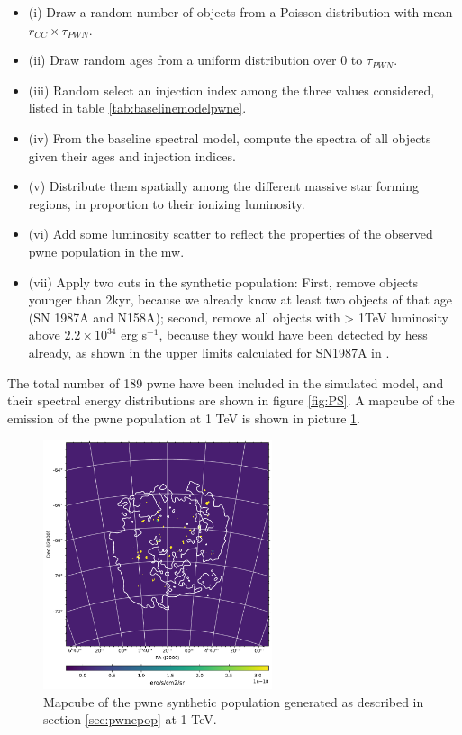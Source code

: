 \documentclass[main.tex]{subfiles}
\begin{document}
\begin{itemize}
\item (i) Draw a random number of objects from a Poisson distribution with mean $r_{CC} \times \tau_{PWN}$.
\item (ii) Draw random ages from a uniform distribution over 0 to $\tau_{PWN}$.
\item(iii) Random select an injection index among the three values considered, listed in table \ref{tab:baselinemodelpwne}.
\item (iv) From the baseline spectral model, compute the spectra of all objects given their ages and injection indices.
\item (v) Distribute them spatially among the different massive star forming regions, in proportion to their ionizing luminosity.
\item(vi) Add some luminosity scatter to reflect the properties of the observed \gls{pwne} population in the \gls{mw}.
  \item(vii) Apply two cuts in the synthetic population: First, remove objects younger than 2kyr, because we already know at least two objects of that age (SN 1987A and N158A); second, remove all objects with > 1TeV luminosity above $2.2 \times 10^{34}$ erg s$^{-1}$, because they would have been detected by \gls{hess} already, as shown in the upper limits calculated for SN1987A in \cite{2012HESSLMC}. 
\end{itemize}

The total number of 189 \gls{pwne} have been included in the simulated model, and their spectral energy distributions are shown in figure \ref{fig:PS}. A mapcube of the emission of the \gls{pwne} population at 1 TeV is shown in picture \ref{fig:mapcube_pwne}.


\begin{figure}
  \centering
  \includegraphics[width=0.6\textwidth]{Pictures/PWNe_1TeVmap.pdf}
  \caption{\label{fig:mapcube_pwne} Mapcube of the \gls{pwne} synthetic population generated as described in section \ref{sec:pwnepop} at 1 TeV.}
\end{figure}
\end{document}
